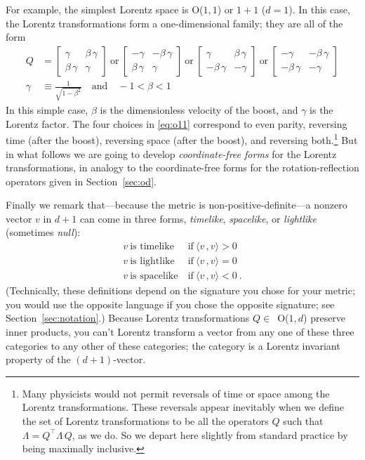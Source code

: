 \documentclass{article}
\newcommand{\inner}[2]{\langle{#1}\,,{#2}\rangle}
\newcommand{\plus}{\!+\!} %
\newcommand{\secref}[1]{Section~\ref{#1}}
\begin{document}
For example, the simplest Lorentz space is O($1,1$) or $1\plus1$ ($d=1$).
In this case, the Lorentz transformations form a one-dimensional family; they are all of the form
\begin{align}
    Q &= \begin{bmatrix}\gamma & \beta\,\gamma \\ \beta\,\gamma & \gamma\end{bmatrix} ~\mbox{or}~
    \begin{bmatrix}-\gamma & -\beta\,\gamma \\ \beta\,\gamma & \gamma\end{bmatrix} ~\mbox{or}~
    \begin{bmatrix}\gamma & \beta\,\gamma \\ -\beta\,\gamma & -\gamma\end{bmatrix}  ~\mbox{or}~
    \begin{bmatrix}-\gamma & -\beta\,\gamma \\ -\beta\,\gamma & -\gamma\end{bmatrix} \label{eq:o11}
    \\
    \gamma &\equiv \frac{1}{\sqrt{1 - \beta^2}} \quad \text{and} \quad -1 < \beta < 1
\end{align}
In this simple case, $\beta$ is the dimensionless velocity of the boost, and $\gamma$ is the Lorentz factor.
The four choices in \eqref{eq:o11} correspond to even parity, reversing time (after the boost), reversing space (after the boost), and reversing both.\footnote{%
Many physicists would not permit reversals of time or space among the Lorentz transformations.
These reversals appear inevitably when we define the set of Lorentz transformations to be all the operators $Q$ such that $\Lambda=Q^\top\Lambda\,Q$, as we do.
So we depart here slightly from standard practice by being maximally inclusive.}
But in what follows we are going to develop \emph{coordinate-free forms} for the Lorentz transformations, in analogy to the coordinate-free forms for the rotation-reflection operators given in \secref{sec:od}.

Finally we remark that---because the metric is non-positive-definite---a nonzero vector $v$ in $d\plus1$ can come in three forms, \emph{timelike}, \emph{spacelike}, or \emph{lightlike} (sometimes \emph{null}):
\begin{align}
    v ~ \mbox{is timelike} &~ \mbox{if} ~ \inner{v}{v} > 0 \\
    v ~ \mbox{is lightlike} &~ \mbox{if} ~ \inner{v}{v} = 0 \\
    v ~ \mbox{is spacelike} &~ \mbox{if} ~ \inner{v}{v} < 0 ~.
\end{align}
(Technically, these definitions depend on the signature you chose for your metric; you would use the opposite language if you chose the opposite signature; see \secref{sec:notation}.)
Because Lorentz transformations $Q\in$~O($1,d$) preserve inner products, you can't Lorentz transform a vector from any one of these three categories to any other of these categories; the category is a Lorentz invariant property of the $(d\plus1)$-vector.
\end{document}
